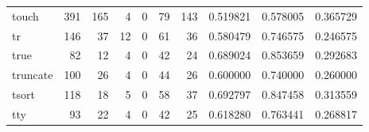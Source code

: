 \begin{tabular}{lrrrrrrrrr}
touch     &                                                391 &                                                165 &                                                  4 &                                                  0 &                                                 79 &                                                143 &                                           0.519821 &                               0.578005 &                             0.365729 \\
tr        &                                                146 &                                                 37 &                                                 12 &                                                  0 &                                                 61 &                                                 36 &                                           0.580479 &                               0.746575 &                             0.246575 \\
true      &                                                 82 &                                                 12 &                                                  4 &                                                  0 &                                                 42 &                                                 24 &                                           0.689024 &                               0.853659 &                             0.292683 \\
truncate  &                                                100 &                                                 26 &                                                  4 &                                                  0 &                                                 44 &                                                 26 &                                           0.600000 &                               0.740000 &                             0.260000 \\
tsort     &                                                118 &                                                 18 &                                                  5 &                                                  0 &                                                 58 &                                                 37 &                                           0.692797 &                               0.847458 &                             0.313559 \\
tty       &                                                 93 &                                                 22 &                                                  4 &                                                  0 &                                                 42 &                                                 25 &                                           0.618280 &                               0.763441 &                             0.268817 \\

\end{tabular}
